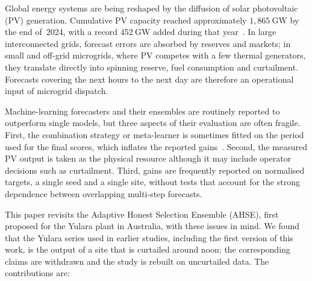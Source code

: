 
Global energy systems are being reshaped by the diffusion of solar photovoltaic (PV) generation.
Cumulative PV capacity reached approximately $1{,}865~\mathrm{GW}$ by the end of~2024, with a
record $452~\mathrm{GW}$ added during that year~\cite{irena2025}. In large interconnected grids,
forecast errors are absorbed by reserves and markets; in small and off-grid microgrids, where PV
competes with a few thermal generators, they translate directly into spinning reserve, fuel
consumption and curtailment. Forecasts covering the next hours to the next day are therefore an
operational input of microgrid dispatch.

Machine-learning forecasters and their ensembles are routinely reported to outperform single
models, but three aspects of their evaluation are often fragile. First, the combination strategy
or meta-learner is sometimes fitted on the period used for the final scores, which inflates the
reported gains~\cite{kaufman2012leakage,kapoor2023leakage}. Second, the measured PV output is
taken as the physical resource although it may include operator decisions such as curtailment.
Third, gains are frequently reported on normalised targets, a single seed and a single site,
without tests that account for the strong dependence between overlapping multi-step forecasts.

This paper revisits the Adaptive Honest Selection Ensemble (AHSE), first proposed for the Yulara
plant in Australia, with these issues in mind. We found that the Yulara series used in earlier
studies, including the first version of this work, is the output of a site that is curtailed
around noon; the corresponding claims are withdrawn and the study is rebuilt on uncurtailed data.
The contributions are:

